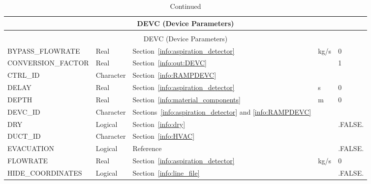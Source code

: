 \documentclass[11pt]{book}
\begin{document}
\begin{longtable}{@{\extracolsep{\fill}}|l|l|l|l|l|}
\caption[Device parameters ({\ct DEVC} namelist group)]{For more information see Section~\ref{info:DEVC}.}
\label{tbl:DEVC} \\
\hline
\multicolumn{5}{|c|}{{\ct DEVC} (Device Parameters)} \\
\hline \hline
\endfirsthead
\caption[]{Continued} \\
\hline
\multicolumn{5}{|c|}{{\ct DEVC} (Device Parameters)} \\
\hline \hline
\endhead
{\ct BYPASS\_FLOWRATE}      & Real            & Section~\ref{info:aspiration_detector}                          & kg/s  & 0             \\ \hline
{\ct CONVERSION\_FACTOR}    & Real            & Section~\ref{info:out:DEVC}                                     &       & 1             \\ \hline
{\ct CTRL\_ID}              & Character       & Section~\ref{info:RAMPDEVC}                                     &       &               \\ \hline
{\ct DELAY}                 & Real            & Section~\ref{info:aspiration_detector}                          & s     & 0             \\ \hline
{\ct DEPTH}                 & Real            & Section~\ref{info:material_components}                          & m     & 0             \\ \hline
{\ct DEVC\_ID}              & Character       & Sections~\ref{info:aspiration_detector} and \ref{info:RAMPDEVC} &       &               \\ \hline
{\ct DRY}                   & Logical         & Section~\ref{info:dry}                                          &       & {\ct .FALSE.} \\ \hline
{\ct DUCT\_ID}              & Character       & Section~\ref{info:HVAC}                                         &       &               \\ \hline
{\ct EVACUATION}            & Logical         & Reference~\cite{FDS_Evac_Users_Guide}                           &       & {\ct .FALSE.} \\ \hline
{\ct FLOWRATE}              & Real            & Section~\ref{info:aspiration_detector}                          & kg/s  & 0             \\ \hline
{\ct HIDE\_COORDINATES}     & Logical         & Section~\ref{info:line_file}                                    &       & {\ct .FALSE.} \\ \hline

\end{longtable}
\end{document}
